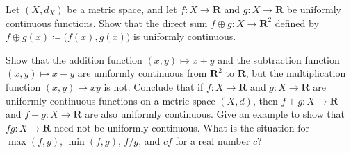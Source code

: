 \begin{exercise}\label{ex 2.3.5}
    Let \((X, d_X)\) be a metric space, and let \(f : X \to \mathbf{R}\) and \(g : X \to \mathbf{R}\) be uniformly continuous functions.
    Show that the direct sum \(f \oplus g : X \to \mathbf{R}^2\) defined by \(f \oplus g(x) \coloneqq \big(f(x), g(x)\big)\) is uniformly continuous.
\end{exercise}

\begin{exercise}\label{ex 2.3.6}
    Show that the addition function \((x, y) \mapsto x + y\) and the subtraction function \((x, y) \mapsto x - y\) are uniformly continuous from \(\mathbf{R}^2\) to \(\mathbf{R}\), but the multiplication function \((x, y) \mapsto xy\) is not.
    Conclude that if \(f : X \to \mathbf{R}\) and \(g : X \to \mathbf{R}\) are uniformly continuous functions on a metric space \((X, d)\), then \(f + g : X \to \mathbf{R}\) and \(f - g : X \to \mathbf{R}\) are also uniformly continuous.
    Give an example to show that \(fg : X \to \mathbf{R}\) need not be uniformly continuous.
    What is the situation for \(\max(f, g)\), \(\min(f, g)\), \(f / g\), and \(cf\) for a real number \(c\)?
\end{exercise}